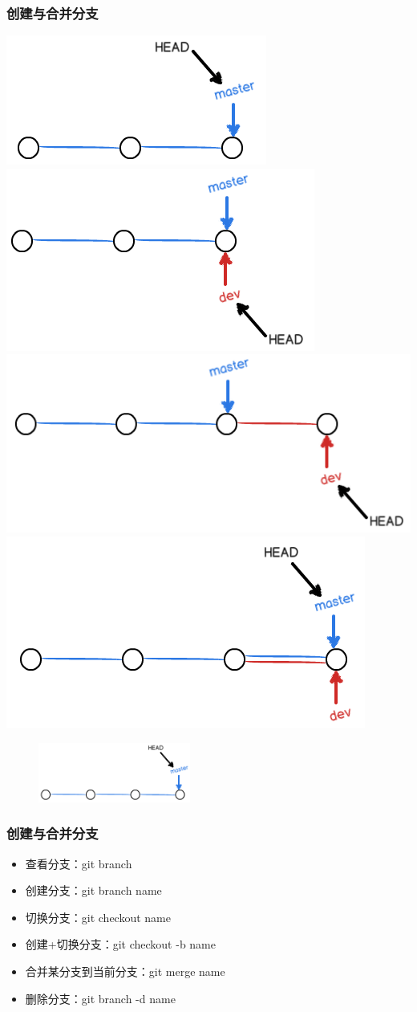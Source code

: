 \documentclass[notheorems,mathserif,table,compress]{beamer}  %
\begin{document}
\begin{frame}
  \frametitle{创建与合并分支}
  \begin{center}
  \includegraphics[width=0.2\linewidth]{1.png}
  \hspace{0.5em}
  \includegraphics[width=0.2\linewidth]{2.png}
  \hspace{0.5em}
  \includegraphics[width=0.2\linewidth]{3.png}
  \hspace{0.5em}
  \includegraphics[width=0.2\linewidth]{4.png}
  \end{center}
  \begin{figure}[h]
  \centering
  \centerline{\includegraphics[width=5cm]{5.png}}
  \end{figure}
\end{frame}


\begin{frame}
  \frametitle{创建与合并分支}
  \begin{tcolorbox}[colback=blue!15,colframe=blue!75!black]  
  \begin{itemize}
  \item 查看分支：git branch
  \item 创建分支：git branch name
  \item 切换分支：git checkout name
  \item 创建+切换分支：git checkout -b name
  \item 合并某分支到当前分支：git merge name
  \item 删除分支：git branch -d name
  \end{itemize}
  \end{tcolorbox}
\end{frame}
\end{document}

